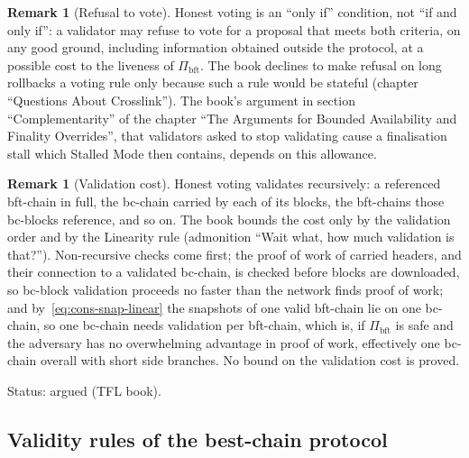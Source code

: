 \documentclass[11pt,a4paper]{article}
\theoremstyle{definition}
\newtheorem{remark}[theorem]{Remark}
\newcommand{\bft}{\mathrm{bft}}
\newcommand{\Pibft}{\Pi_{\bft}}
\begin{document}
\begin{remark}[Refusal to vote]\label{rem:only-if}
Honest voting is an ``only if'' condition, not ``if and only if'': a
validator may refuse to vote for a proposal that meets both criteria, on any
good ground, including information obtained outside the protocol, at a
possible cost to the liveness of $\Pibft$. The book declines to make refusal
on long rollbacks a voting rule only because such a rule would be stateful
(chapter ``Questions About Crosslink''). The book's argument in section
``Complementarity'' of the chapter ``The Arguments for Bounded Availability
and Finality Overrides'', that validators asked to stop validating cause a
finalisation stall which Stalled Mode then contains, depends on this
allowance.
\end{remark}

\begin{remark}[Validation cost]\label{rem:validation-cost}
Honest voting validates recursively: a referenced bft-chain in full, the
bc-chain carried by each of its blocks, the bft-chains those bc-blocks
reference, and so on. The book bounds the cost only by the validation order
and by the Linearity rule (admonition ``Wait what, how much validation is
that?''). Non-recursive checks come first; the proof of work of carried
headers, and their connection to a validated bc-chain, is checked before
blocks are downloaded, so bc-block validation proceeds no faster than the
network finds proof of work; and by~\eqref{eq:cons-snap-linear} the
snapshots of one valid bft-chain lie on one bc-chain, so one bc-chain needs
validation per bft-chain, which is, if $\Pibft$ is safe and the adversary
has no overwhelming advantage in proof of work, effectively one bc-chain
overall with short side branches. No bound on the validation cost is proved.

Status: argued (TFL book).
\end{remark}

\subsection{Validity rules of the best-chain protocol}\label{sec:cons-bc-rules}
\end{document}
